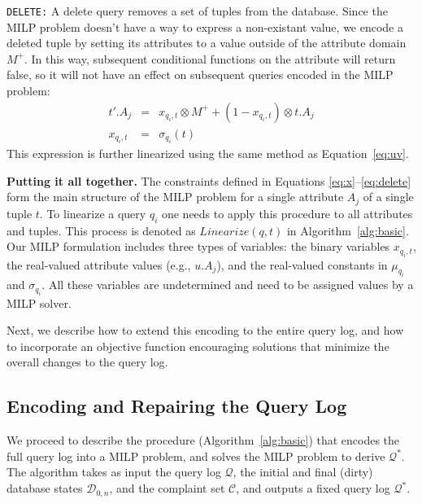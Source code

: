 \smallskip
\noindent
\texttt{DELETE:}
A delete query removes a set of tuples from the database.  
Since the MILP problem doesn't have a way to express a non-existant value, 
we encode a deleted tuple by setting its attributes to a value
outside of the attribute domain $M^+$.  In this way, subsequent conditional functions
on the attribute will return false, so it will not have an effect on subsequent queries encoded
in the MILP problem:
 {\scriptsize
\begin{eqnarray}
\label{eq:delete}
t'.A_j &=& x_{q_i, t} \otimes M^+ + (1-x_{q_i, t}) \otimes t.A_j \\
x_{q_i, t} &=& \sigma_{q_i}(t)\nonumber 
\end{eqnarray}
 }
This expression is further linearized using the same method as Equation~\eqref{eq:uv}.

\smallskip
\noindent
\textbf{Putting it all together.}
The constraints defined in Equations \eqref{eq:x}--\eqref{eq:delete}
form the main structure of the MILP problem for a single attribute
$A_j$ of a single tuple $t$. To linearize a query $q_i$ one needs to
apply this procedure to all attributes and tuples. This process is
denoted as $Linearize(q, t)$ in Algorithm~\ref{alg:basic}. Our MILP
formulation includes three types of variables: the binary variables
$x_{q_i, t}$, the real-valued attribute values (e.g., $u.A_j$), and
the real-valued constants in $\mu_{q_i}$ and $\sigma_{q_i}$. All these
variables are undetermined and need to be assigned values by a MILP
solver.


Next, we describe how to extend this encoding to the entire query log,
and how to incorporate an objective function encouraging solutions
that minimize the overall changes to the query log.







\subsection{Encoding and Repairing the Query Log}
\label{sec:milp}

We proceed to describe the procedure (Algorithm~\ref{alg:basic}) that encodes 
the full query log into a MILP problem, and solves the MILP problem to derive $\mathcal{Q}^*$.
The algorithm takes as input the query log $\mathcal{Q}$, 
the initial and final (dirty) database states 
$\mathcal{D}_{0, n}$, and the complaint set $\mathcal{C}$, and outputs a fixed query 
log $\mathcal{Q}^*$.  

